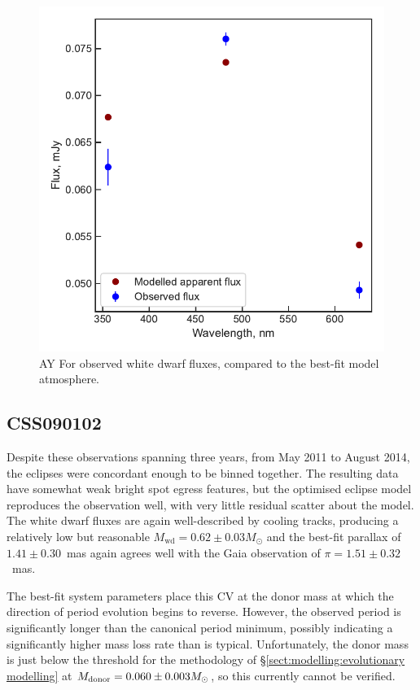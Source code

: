 \begin{figure}
    \centering
    \includegraphics[width=\textwidth]{figures/results/AYFor/fluxplot.pdf}
    \caption{AY For observed white dwarf fluxes, compared to the best-fit model atmosphere.}
    \label{fig:AYFor flux plot}
\end{figure}
\clearpage



\newpage
\subsection{CSS090102}

Despite these observations spanning three years, from May 2011 to August 2014, the eclipses were concordant enough to be binned together.
The resulting data have somewhat weak bright spot egress features, but the optimised eclipse model reproduces the observation well, with very little residual scatter about the model.
The white dwarf fluxes are again well-described by cooling tracks, producing a relatively low but reasonable $M_\mathrm{wd} = 0.62\pm0.03 M_\odot$ and the best-fit parallax of $1.41\pm0.30$~mas again agrees well with the Gaia observation of $\pi = 1.51\pm0.32$~mas.

The best-fit system parameters place this CV at the donor mass at which the direction of period evolution begins to reverse. However, the observed period is significantly longer than the canonical period minimum, possibly indicating a significantly higher mass loss rate than is typical. Unfortunately, the donor mass is just below the threshold for the methodology of \S\ref{sect:modelling:evolutionary modelling} at $M_{\rm donor} = 0.060\pm0.003 M_\odot$, so this currently cannot be verified.


